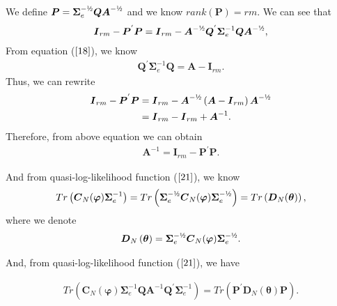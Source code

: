 \documentclass[12pt,a4paper,hyperref]{article}
\begin{document}
 We define $\boldsymbol{P}=\boldsymbol{\Sigma}_{e}^{-\text{\textonehalf}}\boldsymbol{Q}\boldsymbol{A}^{-\text{\textonehalf}}$ and we know $rank\left( \boldsymbol{P}\right)=rm$. We can see that
\begin{align}
\boldsymbol{I}_{rm}-\boldsymbol{P}^{'}\boldsymbol{P}=\boldsymbol{I}_{rm}-\boldsymbol{A}^{-\text{\textonehalf}}\boldsymbol{Q}^{'}\boldsymbol{\Sigma}_{e}^{-1}\boldsymbol{Q}\boldsymbol{A}^{-\text{\textonehalf}},
\end{align}
From equation ($\ref{18}$), we know
\begin{align}
\boldsymbol{Q}^{'}\boldsymbol{\Sigma}_{e}^{-1}\boldsymbol{Q}=\boldsymbol{A}-\boldsymbol{I}_{rm}.
\end{align}
 Thus, we can rewrite
\begin{align}
\begin{split}
\boldsymbol{I}_{rm}-\boldsymbol{P}^{'}\boldsymbol{P}&=\boldsymbol{I}_{rm}-\boldsymbol{A}^{-\text{\textonehalf}}\left( \boldsymbol{A}-\boldsymbol{I}_{rm}  \right)\boldsymbol{A}^{-\text{\textonehalf}} \\
&=\boldsymbol{I}_{rm}-\boldsymbol{I}_{rm}+\boldsymbol{A}^{ -1}.
\end{split}
\end{align}
Therefore, from above equation we can obtain
\begin{align}
\boldsymbol{A}^{-1}=\boldsymbol{I}_{rm}-\boldsymbol{P}^{'}\boldsymbol{P}.
\end{align}

And from quasi-log-likelihood function ($\ref{21}$), we know
\begin{align}
Tr\left(\boldsymbol{C}_{N}(\boldsymbol{\varphi})\boldsymbol{\Sigma}_{e}^{-1}\right)= Tr\left( \boldsymbol{\Sigma}^{-\text{\textonehalf}}_{e}\boldsymbol{C}_{N}(\boldsymbol{\varphi})\boldsymbol{\Sigma}^{-\text{\textonehalf}}_{e}  \right) =Tr\left(\boldsymbol{ D}_{N}(\boldsymbol{\theta}) \right),
\end{align}
where we denote
\begin{align}
\boldsymbol{D}_{N}\left( \boldsymbol{\theta}\right)= \boldsymbol{\Sigma}^{-\text{\textonehalf}}_{e}\boldsymbol{C}_{N}(\boldsymbol{\varphi})\boldsymbol{\Sigma}^{-\text{\textonehalf}}_{e}.
\end{align}

And, from quasi-log-likelihood function ($\ref{21}$), we have

\begin{align}
Tr\left(\boldsymbol{C}_{N}(\boldsymbol{\varphi})\boldsymbol{\Sigma}_{e}^{-1}\boldsymbol{Q}\boldsymbol{A}^{-1}\boldsymbol{Q}^{'}\boldsymbol{\Sigma}_{e}^{-1}  \right)=Tr \left(\boldsymbol{P}^{'}\boldsymbol{D}_{N}(\boldsymbol{\theta})\boldsymbol{P} \right).
\end{align}
\end{document}
